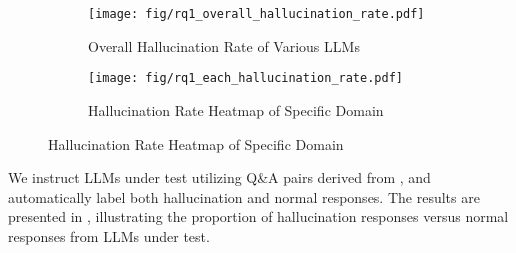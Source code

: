 \begin{figure}[!t]
\hspace{-4mm}
\centering
\begin{subfigure}{}%
\centering
\texttt{[image: fig/rq1\_overall\_hallucination\_rate.pdf]}\\
\vspace{-0.2cm}
\caption{Overall Hallucination Rate of Various LLMs}
\vspace{0.3cm}
\label{fig:overall}
\end{subfigure}
\begin{subfigure}{}%
\centering
\texttt{[image: fig/rq1\_each\_hallucination\_rate.pdf]}
\caption{Hallucination Rate Heatmap of Specific Domain}
\label{fig:rq1.2}
\end{subfigure}
\vspace{-3mm}
\end{figure}


 We instruct LLMs under test utilizing Q\&A pairs derived from \tool, and automatically label both hallucination and normal responses. The results are presented in , illustrating the proportion of hallucination responses versus normal responses from LLMs under test.

